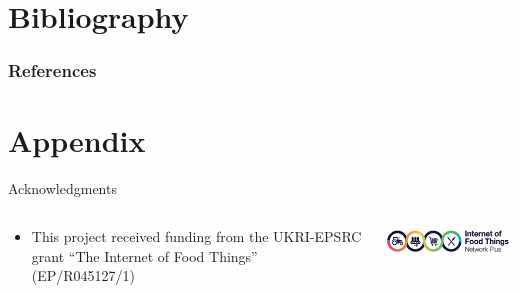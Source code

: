 \documentclass[aspectratio=169]{beamer}
\begin{document}
  \section{Bibliography}

    \begin{frame}[allowframebreaks]
      \frametitle{References}
      
    \end{frame}

  \section{Appendix}


    \begin{frame}{Acknowledgments}
      \begin{columns}
        \begin{column}{0.5\textwidth}
          \begin{itemize}
            \item This project received funding from the UKRI-EPSRC grant “The Internet of Food Things” (EP/R045127/1)
          \end{itemize}
        \end{column}
        \begin{column}{0.5\textwidth}
          \includegraphics[width=0.5\linewidth]{ioft.png}
        \end{column}
      \end{columns}
    \end{frame}
\end{document}
